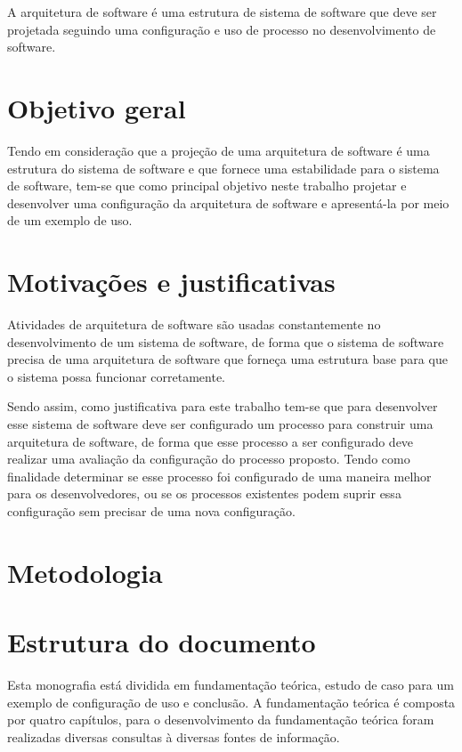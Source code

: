 A arquitetura de software é uma estrutura de sistema de software que deve ser projetada seguindo uma configuração e uso de processo no desenvolvimento de software.

\section{Objetivo geral}

Tendo em consideração que a projeção de uma arquitetura de software é uma estrutura do sistema de software e que fornece uma estabilidade para o sistema de software, tem-se que como principal objetivo neste trabalho projetar e desenvolver uma configuração da arquitetura de software e apresentá-la por meio de um exemplo de uso.

\section{Motivações e justificativas}

Atividades de arquitetura de software são usadas constantemente no desenvolvimento de um sistema de software, de forma que o sistema de software precisa de uma arquitetura de software que forneça uma estrutura base para que o sistema possa funcionar corretamente.


Sendo assim, como justificativa para este trabalho tem-se que para desenvolver esse sistema de software deve ser configurado um processo para construir uma arquitetura de software, de forma que esse processo a ser configurado deve realizar uma avaliação da configuração do processo proposto. Tendo como finalidade determinar se esse processo foi configurado de uma maneira melhor para os desenvolvedores, ou se os processos existentes podem suprir essa configuração sem precisar de uma nova configuração.

\section{Metodologia}
\section{Estrutura do documento}

Esta monografia está dividida em fundamentação teórica, estudo de caso para um exemplo de configuração de uso e conclusão.
A fundamentação teórica é composta por quatro capítulos, para o desenvolvimento da fundamentação teórica foram realizadas diversas consultas à diversas fontes de informação.

